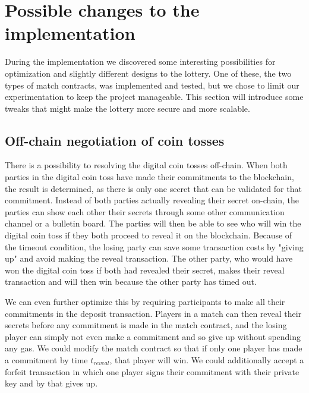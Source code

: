 \section{Possible changes to the implementation}
\label{sec:optimizations}

During the implementation we discovered some interesting possibilities for optimization and slightly different designs to the lottery. One of these, the two types of match contracts, was implemented and tested, but we chose to limit our experimentation to keep the project manageable. This section will introduce some tweaks that might make the lottery more secure and more scalable.


\subsection{Off-chain negotiation of coin tosses}
There is a possibility to resolving the digital coin tosses off-chain. When both parties in the digital coin toss have made their commitments to the blockchain, the result is determined, as there is only one secret that can be validated for that commitment. Instead of both parties actually revealing their secret on-chain, the parties can show each other their secrets through some other communication channel or a bulletin board. The parties will then be able to see who will win the digital coin toss if they both proceed to reveal it on the blockchain. Because of the timeout condition, the losing party can save some transaction costs by "giving up" and avoid making the reveal transaction. The other party, who would have won the digital coin toss if both had revealed their secret, makes their reveal transaction and will then win because the other party has timed out.

We can even further optimize this by requiring participants to make all their commitments in the deposit transaction. Players in a match can then reveal their secrets before any commitment is made in the match contract, and the losing player can simply not even make a commitment and so give up without spending any gas. We could modify the match contract so that if only one player has made a commitment by time $t_{reveal}$, that player will win. We could additionally accept a forfeit transaction in which one player signs their commitment with their private key and by that gives up.


